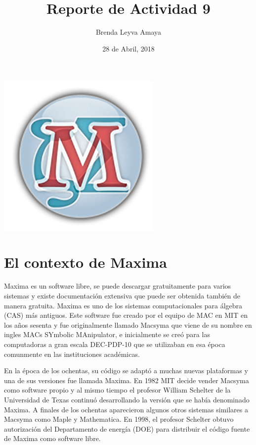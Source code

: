 \documentclass{article} %
\title{Reporte de Actividad 9}
\author{Brenda Leyva Amaya}
\date{28 de Abril, 2018}
\begin{document}
\maketitle %

\begin{center}
	\includegraphics[width=8cm]{logo.png}
\end{center}

\vspace{5.0 cm}

\section{El contexto de Maxima}

Maxima es un software libre, se puede descargar gratuitamente para varios sistemas y existe documentación extensiva que puede ser obtenida también de manera gratuita. Maxima es uno de los sistemas computacionales para álgebra  (CAS) más antiguos. Este software fue creado por el equipo de MAC en MIT en los años sesenta y fue originalmente llamado Macsyma que viene de su nombre en ingles MACs SYmbolic MAnipulator, e inicialmente se creó para las computadoras a gran escala DEC-PDP-10 que se utilizaban en esa época comunmente en las instituciones académicas. 

\vspace{0.5 cm}

En la época de los ochentas, su código se adaptó a muchas nuevas plataformas y una de sus versiones fue llamada Maxima. En 1982 MIT decide vender Macsyma como software propio y al mismo tiempo el profesor William Schelter de la Universidad de Texas continuó desarrollando la versión que se había denominado Maxima. A finales de los ochentas aparecieron algunos otros sistemas similares a Macsyma como Maple y Mathematica. En 1998, el profesor Schelter obtuvo autorización del Departamento de energía (DOE) para distribuir el código fuente de Maxima como software libre. 
\end{document}
